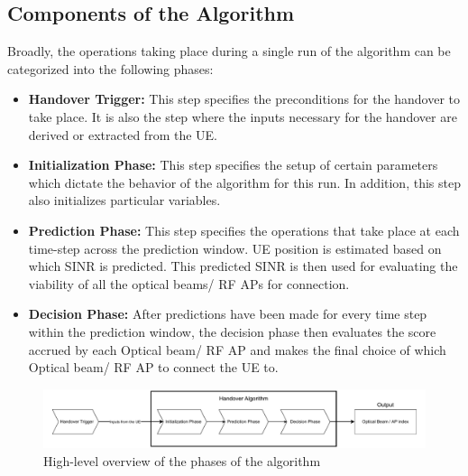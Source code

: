 \subsection{Components of the Algorithm}
Broadly, the operations taking place during a single run of the algorithm can be categorized into the following phases:
\begin{itemize}
    \item \textbf{Handover Trigger:} This step specifies the preconditions for the handover to take place. It is also the step where the inputs necessary for the handover are derived or extracted from the UE.
    \item \textbf{Initialization Phase:} This step specifies the setup of certain parameters which dictate the behavior of the algorithm for this run. In addition, this step also initializes particular variables.
    \item \textbf{Prediction Phase:} This step specifies the operations that take place at each time-step across the prediction window. UE position is estimated based on which SINR is predicted. This predicted SINR is then used for evaluating the viability of all the optical beams/ RF APs for connection.
    \item \textbf{Decision Phase:} After predictions have been made for every time step within the prediction window, the decision phase then evaluates the score accrued by each Optical beam/ RF AP and makes the final choice of which Optical beam/ RF AP to connect the UE to.
\end{itemize}
\begin{figure}
    \centering
    \includegraphics[width=1\linewidth]{Figures/Algorithm-design-High level overview.drawio.pdf}
    \caption{High-level overview of the phases of the algorithm}
    \label{fig:algo-overview}
\end{figure}

\label{subsec:algo_overview}

